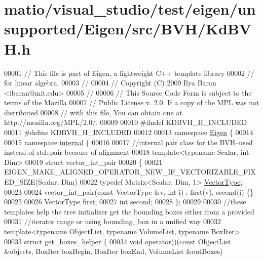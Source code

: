 \hypertarget{matio_2visual__studio_2test_2eigen_2unsupported_2_eigen_2src_2_b_v_h_2_kd_b_v_h_8h_source}{}\section{matio/visual\+\_\+studio/test/eigen/unsupported/\+Eigen/src/\+B\+V\+H/\+Kd\+B\+VH.h}
\label{matio_2visual__studio_2test_2eigen_2unsupported_2_eigen_2src_2_b_v_h_2_kd_b_v_h_8h_source}

\begin{DoxyCode}
00001 \textcolor{comment}{// This file is part of Eigen, a lightweight C++ template library}
00002 \textcolor{comment}{// for linear algebra.}
00003 \textcolor{comment}{//}
00004 \textcolor{comment}{// Copyright (C) 2009 Ilya Baran <ibaran@mit.edu>}
00005 \textcolor{comment}{//}
00006 \textcolor{comment}{// This Source Code Form is subject to the terms of the Mozilla}
00007 \textcolor{comment}{// Public License v. 2.0. If a copy of the MPL was not distributed}
00008 \textcolor{comment}{// with this file, You can obtain one at http://mozilla.org/MPL/2.0/.}
00009 
00010 \textcolor{preprocessor}{#ifndef KDBVH\_H\_INCLUDED}
00011 \textcolor{preprocessor}{#define KDBVH\_H\_INCLUDED}
00012 
00013 \textcolor{keyword}{namespace }\hyperlink{namespace_eigen}{Eigen} \{ 
00014 
00015 \textcolor{keyword}{namespace }\hyperlink{namespaceinternal}{internal} \{
00016 
00017 \textcolor{comment}{//internal pair class for the BVH--used instead of std::pair because of alignment}
00018 \textcolor{keyword}{template}<\textcolor{keyword}{typename} Scalar, \textcolor{keywordtype}{int} Dim>
00019 \textcolor{keyword}{struct }vector\_int\_pair
00020 \{
00021 EIGEN\_MAKE\_ALIGNED\_OPERATOR\_NEW\_IF\_VECTORIZABLE\_FIXED\_SIZE(Scalar, Dim)
00022   \textcolor{keyword}{typedef} Matrix<Scalar, Dim, 1> \hyperlink{struct_vector_type}{VectorType};
00023 
00024   vector\_int\_pair(\textcolor{keyword}{const} VectorType &v, \textcolor{keywordtype}{int} i) : first(v), second(i) \{\}
00025 
00026   VectorType first;
00027   \textcolor{keywordtype}{int} second;
00028 \};
00029 
00030 \textcolor{comment}{//these templates help the tree initializer get the bounding boxes either from a provided}
00031 \textcolor{comment}{//iterator range or using bounding\_box in a unified way}
00032 \textcolor{keyword}{template}<\textcolor{keyword}{typename} ObjectList, \textcolor{keyword}{typename} VolumeList, \textcolor{keyword}{typename} BoxIter>
00033 \textcolor{keyword}{struct }get\_boxes\_helper \{
00034   \textcolor{keywordtype}{void} operator()(\textcolor{keyword}{const} ObjectList &objects, BoxIter boxBegin, BoxIter boxEnd, VolumeList &outBoxes)

\end{DoxyCode}
